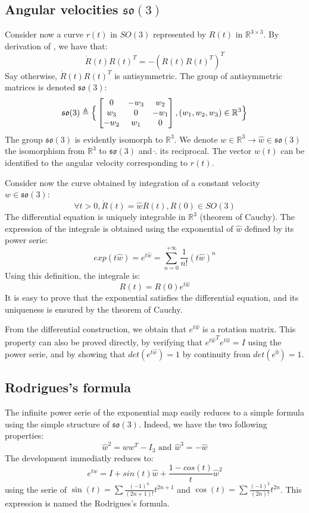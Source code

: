 \documentclass{book}
\begin{document}
\subsection{Angular velocities $\mathfrak{so}(3)$}

Consider now a curve $r(t)$ in $SO(3)$ represented by $R(t)$ in $\mathbb{R}^{3\times3}$. By derivation of , we have that:
\[ \dot{R}(t) R(t)^T = - ( \dot{R}(t) R(t)^T )^T \]
Say otherwise, $\dot{R}(t) R(t)^T$ is antisymmetric. The group of antisymmetric matrices is denoted $\mathfrak{so}(3)$:
\[ \mathfrak{so}(3) \triangleq \Big\{ \begin{bmatrix} 0 & -w_3  & w_2 \\ w_3 & 0 & -w_1 \\ -w_2 & w_1 & 0 \end{bmatrix}, (w_1,w_2,w_3) \in \mathbb{R}^3 \Big\} \]
The group $\mathfrak{so}(3)$ is evidently isomorph to $\mathbb{R}^3$. We denote $w \in \mathbb{R}^3 \rightarrow \hat{w} \in \mathfrak{so}(3)$ the isomorphism from $\mathbb{R}^3$ to $\mathfrak{so}(3)$ and $\check{.}$ its reciprocal. The vector $w(t)$ can be identified to the angular velocity corresponding to $r(t)$.

Consider now the curve obtained by integration of a constant velocity $w \in \mathfrak{so}(3)$:
\[ \forall t>0, \dot{R}(t) = \hat{w} R(t), R(0) \in SO(3) \]
The differential equation is uniquely integrable in $\mathbb{R}^3$ (theorem of Cauchy). The expression of the integrale is obtained using the exponential of $\hat{w}$ defined by its power serie:
\[ exp( t \hat w  ) = e^{t \hat w} = \sum_{n=0}^{+\infty} \frac{1}{n!} (t \hat w)^n \]
Using this definition, the integrale is:
\[ R(t) = R(0) e^{t \hat w} \]
It is easy to prove that the exponential satisfies the differential equation, and its uniqueness is ensured by the theorem of Cauchy.

From the differential construction, we obtain that $e^{t \hat w}$ is a rotation matrix. This property can also be proved directly, by verifying that ${e^{t \hat w}}^T e^{t \hat w} = I$ using the power serie, and by showing that $det(e^{t \hat w})=1$ by continuity from $det(e^0)=1$.

\subsection{Rodrigues's formula}

The infinite power serie of the exponential map easily reduces to a simple formula using the simple structure of $\mathfrak{so}(3)$. Indeed, we have the two following properties:
\[ \hat{w}^2 = ww^T - I_3 \textrm{ and } \hat{w}^3 = -\hat{w} \]
The development immediatly reduces to:
\[ e^{t \hat w} = I + sin(t) \hat{w} + \frac{1-cos(t)}{t} \hat{w}^2 \]
using the serie of $\sin(t) = \sum \frac{(-1)^{n}}{(2n+1)!} t^{2n+1} $ and $\cos(t) = \sum \frac{(-1)^2}{(2n)!} t^{2n}$.
This expression is named the Rodrigues's formula.
\end{document}
